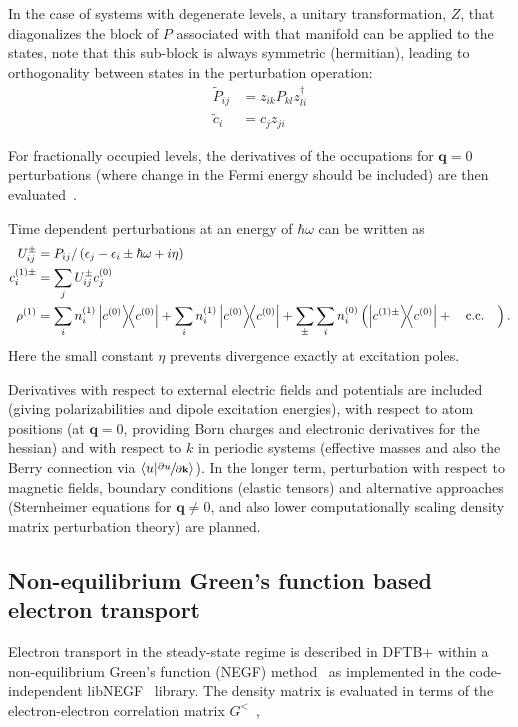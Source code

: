 \documentclass[reprint,onecolumn,superscriptaddress]{revtex4-1}
\newcommand{\dftbp}{DFTB+}
\begin{document}
In the case of systems with degenerate levels, a unitary transformation, $Z$, that
diagonalizes the block of $P$ associated with that manifold can be applied to
the states, note that this sub-block is always symmetric (hermitian), leading to
orthogonality between states in the perturbation operation:
\begin{align}
  \tilde{P}_{ij} &= z_{ik} P_{kl} z_{li}^\dag\\
  \tilde{c}_i &= c_j z_{ji}
\end{align}

For fractionally occupied levels, the derivatives of the occupations for
$\mathbf{q}=0$ perturbations (where change in the Fermi energy should be
included) are then evaluated~\cite{nishimoto2017317}.

Time dependent perturbations at an energy of $\hbar \omega$ can be written as
\begin{align}
  U_{ij}^\pm &= P_{ij} / \left( \epsilon_j - \epsilon_i \pm \hbar \omega + i\eta
               \right)\\
  c_i^{(1)\pm} &= \sum_j U_{ij}^\pm c_j^{(0)}\\
  \rho^{(1)} &= \sum_i n^{(1)}_i \dyad{c^{(0)}} + \sum_i n^{(1)}_i \dyad{c^{(0)}}
               + \sum_\pm \sum_i n^{(0)}_i \left( \dyad{c^{(1)\pm}}{c^{(0)}} + \qcc \right).
\end{align}
Here the small constant $\eta$ prevents divergence exactly at excitation
poles.

Derivatives with respect to external electric fields and potentials are included
(giving polarizabilities and dipole excitation energies), with respect to atom
positions (at $\mathbf{q}=0$, providing Born charges and electronic derivatives
for the hessian) and with respect to $k$ in periodic systems (effective masses
and also the Berry connection via $\braket{u}{\sfrac{\partial u}{\partial
    \mathbf{k}}}$). In the longer term, perturbation with respect to magnetic
fields, boundary conditions (elastic tensors) and alternative approaches
(Sternheimer equations for $\mathbf{q}\ne0$, and also lower computationally scaling
density matrix perturbation theory) are planned.

\subsection{Non-equilibrium Green's function based electron transport}

Electron transport in the steady-state regime is described in \dftbp{} within a
non-equilibrium Green's function (NEGF) method~\cite{pecchia2004, haug2008} as
implemented in the code-independent libNEGF~\cite{libnegf-repo} library.  The
density matrix is evaluated in terms of the electron-electron correlation matrix
$G^{<}$~\cite{haug2008},
\end{document}
